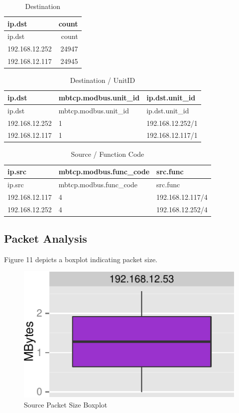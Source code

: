 \documentclass[11pt,]{article}
\begin{document}
\begin{longtable}[c]{@{}lr@{}}
\caption{Destination}\tabularnewline
\toprule
ip.dst & count\tabularnewline
\midrule
\endfirsthead
\toprule
ip.dst & count\tabularnewline
\midrule
\endhead
192.168.12.252 & 24947\tabularnewline
192.168.12.117 & 24945\tabularnewline
\bottomrule
\end{longtable}

\newpage

\begin{longtable}[c]{@{}lll@{}}
\caption{Destination / UnitID}\tabularnewline
\toprule
ip.dst & mbtcp.modbus.unit\_id & ip.dst.unit\_id\tabularnewline
\midrule
\endfirsthead
\toprule
ip.dst & mbtcp.modbus.unit\_id & ip.dst.unit\_id\tabularnewline
\midrule
\endhead
192.168.12.252 & 1 & 192.168.12.252/1\tabularnewline
192.168.12.117 & 1 & 192.168.12.117/1\tabularnewline
\bottomrule
\end{longtable}

\begin{longtable}[c]{@{}lll@{}}
\caption{Source / Function Code}\tabularnewline
\toprule
ip.src & mbtcp.modbus.func\_code & src.func\tabularnewline
\midrule
\endfirsthead
\toprule
ip.src & mbtcp.modbus.func\_code & src.func\tabularnewline
\midrule
\endhead
192.168.12.117 & 4 & 192.168.12.117/4\tabularnewline
192.168.12.252 & 4 & 192.168.12.252/4\tabularnewline
\bottomrule
\end{longtable}

\subsection{Packet Analysis}\label{packet-analysis}

Figure 11 depicts a boxplot indicating packet size.

\begin{figure}

{\centering \includegraphics{thesis_files/figure-latex/unnamed-chunk-21-1} 

}

\caption{Source Packet Size Boxplot}\label{fig:unnamed-chunk-21}
\end{figure}
\end{document}
